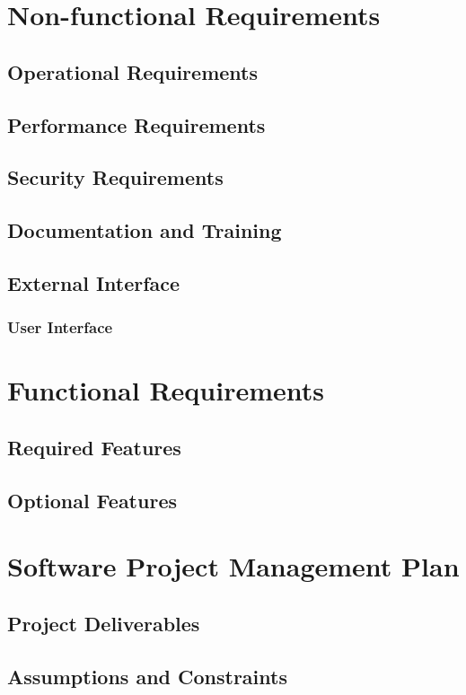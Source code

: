 \documentclass[12pt]{article}
\begin{document}
\section{Non-functional Requirements}
\subsection{Operational Requirements}
\subsection{Performance Requirements}
\subsection{Security Requirements}
\subsection{Documentation and Training}
\subsection{External Interface}
\subsubsection{User Interface}

\section{Functional Requirements}
\subsection{Required Features}
\subsection{Optional Features}


\section{Software Project Management Plan}
\subsection{Project Deliverables}
\subsection{Assumptions and Constraints}
\end{document}
